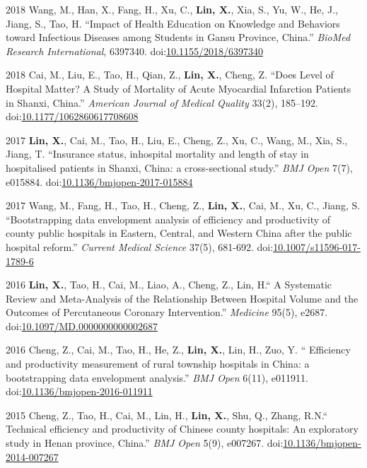 \documentclass[12pt,letterpaper]{report}
\begin{document}
\begin{tablist}
		\item[2018] \tab Wang, M., Han, X., Fang, H., Xu, C., \textbf{Lin, X.}, Xia, S., Yu, W., He, J., Jiang, S., Tao, H. \enquote{Impact of Health Education on Knowledge and Behaviors toward Infectious Diseases among Students in Gansu Province, China.} \textit{BioMed Research International}, 6397340. doi:\href{https://doi.org/10.1155/2018/6397340}{10.1155/2018/6397340}
		
		\item[2018] \tab Cai, M., Liu, E., Tao, H., Qian, Z., \textbf{Lin, X.}, Cheng, Z. \enquote{Does Level of Hospital Matter? A Study of Mortality of Acute Myocardial Infarction Patients in Shanxi, China.} \textit{American Journal of Medical Quality}  33(2), 185–192. doi:\href{https://doi.org/10.1177/1062860617708608}{10.1177/1062860617708608}
		
		\item[2017] \tab  \textbf{Lin, X.}, Cai, M., Tao, H., Liu, E., Cheng, Z., Xu, C., Wang, M., Xia, S., Jiang, T. \enquote{Insurance status, inhospital mortality and length of stay in hospitalised patients in Shanxi, China: a cross-sectional study.} \textit{BMJ Open}  7(7), e015884. doi:\href{https://doi.org/10.1136/bmjopen-2017-015884}{10.1136/bmjopen-2017-015884}
		   
		\item[2017] \tab Wang, M., Fang, H., Tao, H., Cheng, Z., \textbf{Lin, X.}, Cai, M., Xu, C., Jiang, S. \enquote{Bootstrapping data envelopment analysis of efficiency and productivity of county public hospitals in Eastern, Central, and Western China after the public hospital reform.} \textit{Current Medical Science}  37(5), 681-692. doi:\href{https://doi.org/10.1007/s11596-017-1789-6}{10.1007/s11596-017-1789-6}
    	 
		\item[2016] \tab \textbf{Lin, X.}, Tao, H., Cai, M., Liao, A., Cheng, Z., Lin, H.\enquote{ A Systematic Review and Meta-Analysis of the Relationship Between Hospital Volume and the Outcomes of Percutaneous Coronary Intervention.} \textit{Medicine}  95(5), e2687. doi:\href{https://doi.org/10.1097/MD.0000000000002687}{10.1097/MD.0000000000002687}
				
		\item[2016] \tab Cheng, Z., Cai, M., Tao, H., He, Z., \textbf{Lin, X.}, Lin, H., Zuo, Y. \enquote{ Efficiency and productivity measurement of rural township hospitals in China: a bootstrapping data envelopment analysis.} \textit{BMJ Open}  6(11), e011911. doi:\href{https://doi.org/10.1136/bmjopen-2016-011911}{10.1136/bmjopen-2016-011911}
		
		\item[2015] \tab Cheng, Z., Tao, H., Cai, M., Lin, H., \textbf{Lin, X.}, Shu, Q., Zhang, R.N.\enquote{ Technical efficiency and productivity of Chinese county hospitals: An exploratory study in Henan province, China.} \textit{BMJ Open}  5(9), e007267. doi:\href{https://doi.org/10.1136/bmjopen-2014-007267}{10.1136/bmjopen-2014-007267}

 	\end{tablist}
\end{document}
